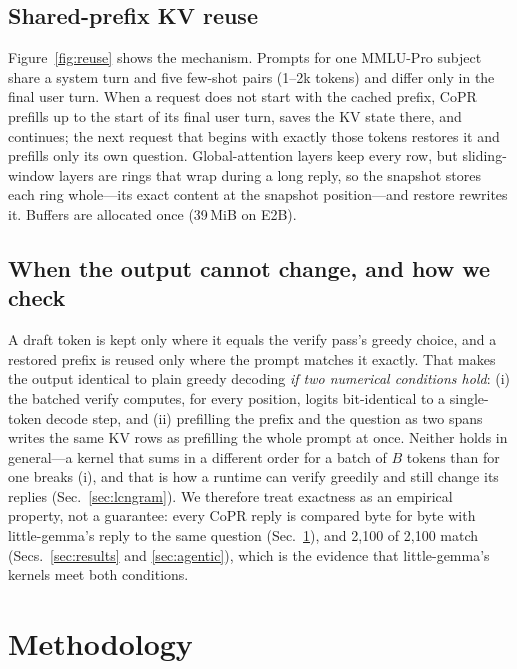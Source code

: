 \documentclass[conference]{IEEEtran}
\newcommand{\sys}{CoPR}
\newcommand{\lgm}{little-gemma}
\begin{document}
\subsection{Shared-prefix KV reuse}
Figure~\ref{fig:reuse} shows the mechanism. Prompts for one MMLU-Pro subject share a system turn and five few-shot pairs
(1--2k tokens) and differ only in the final user turn. When a request does not
start with the cached prefix, \sys{} prefills up to the start of its final user
turn, saves the KV state there, and continues; the next request that begins
with exactly those tokens restores it and prefills only its own question.
Global-attention layers keep every row, but sliding-window layers are rings that
wrap during a long reply, so the snapshot stores each ring whole---its exact
content at the snapshot position---and restore rewrites it. Buffers are
allocated once (39\,MiB on E2B).

\subsection{When the output cannot change, and how we check}
A draft token is kept only where it equals the verify pass's greedy choice, and
a restored prefix is reused only where the prompt matches it exactly. That
makes the output identical to plain greedy decoding \emph{if two numerical
conditions hold}: (i) the batched verify computes, for every position, logits
bit-identical to a single-token decode step, and (ii) prefilling the prefix and
the question as two spans writes the same KV rows as prefilling the whole
prompt at once. Neither holds in general---a kernel that sums in a different
order for a batch of $B$ tokens than for one breaks (i), and that is how a
runtime can verify greedily and still change its replies
(Sec.~\ref{sec:lcngram}). We therefore treat exactness as an empirical
property, not a guarantee: every \sys{} reply is compared byte for byte with
\lgm{}'s reply to the same question (Sec.~\ref{sec:method}), and 2{,}100 of
2{,}100 match (Secs.~\ref{sec:results} and \ref{sec:agentic}), which is the evidence that \lgm{}'s kernels meet both
conditions.

\section{Methodology}\label{sec:method}
\end{document}
